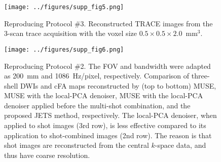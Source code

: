 \documentclass[a4paper,11pt,twoside]{report}
\begin{document}
    \begin{figure}[h]
        \texttt{[image: ../figures/supp\_fig5.png]}
        \caption{Reproducing Protocol \#3.
        Reconstructed TRACE images from the 3-scan trace acquisition with
        the voxel size $0.5\times0.5\times2.0$~mm$^3$.}
    \end{figure}

    \begin{figure}[h]
        \texttt{[image: ../figures/supp\_fig6.png]}
        \caption{Reproducing Protocol \#2.
        The FOV and bandwidth were adapted as
        \SI{200}{mm} and 1086~Hz/pixel, respectively.
        Comparison of three-shell DWIs and cFA maps
        reconstructed by (top to bottom)
        MUSE, MUSE with the local-PCA denoiser,
        MUSE with the local-PCA denoiser applied
        before the multi-shot combination,
        and the proposed JETS method, respectively.
        The local-PCA denoiser,
        when applied to shot images (3rd row),
        is less effective compared to
        its application to shot-combined images (2nd row).
        The reason is that shot images are reconstructed
        from the central $k$-space data,
        and thus have coarse resolution.}
        \label{SUPPFIG:6}
    \end{figure}
\end{document}
